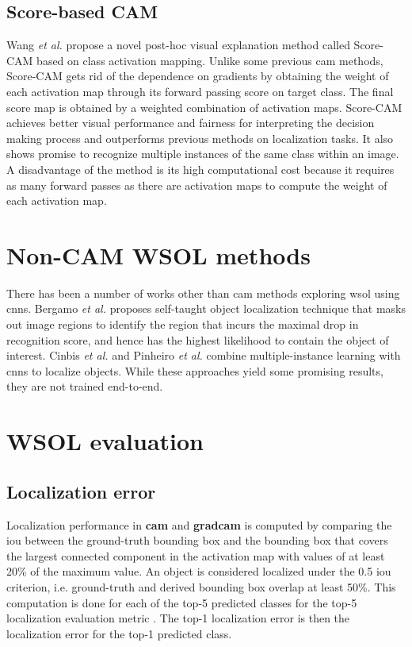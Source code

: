 \subsection{Score-based CAM}
Wang \textit{et al.} \cite{wang2020score} propose a novel post-hoc visual explanation method called Score-CAM based on class activation mapping. Unlike some previous \acrshort{cam} methods, Score-CAM gets rid of the dependence on gradients by obtaining the weight of each activation map through its forward passing score on target class. The final score map is obtained by a weighted combination of activation maps. Score-CAM achieves better visual performance and fairness for interpreting the decision making process and outperforms previous methods on localization tasks. It also shows promise to recognize multiple instances of the same class within an image. A disadvantage of the method is its high computational cost because it requires as many forward passes as there are activation maps to compute the weight of each activation map.

\section{Non-CAM WSOL methods}
There has been a number of works other than \acrshort{cam} methods exploring \acrfull{wsol} using \acrshort{cnn}s. Bergamo \textit{et al.} \cite{bazzani2016self} proposes self-taught object localization technique that masks out image regions to identify the region that incurs the maximal drop in recognition score, and hence has the highest likelihood to contain the object of interest. Cinbis \textit{et al.} \cite{cinbis2016weakly} and Pinheiro \textit{et al.} \cite{pinheiro2015image} combine multiple-instance learning with \acrshort{cnn}s to localize objects. While these approaches yield some promising results, they are not trained end-to-end.

\section{WSOL evaluation}
\subsection{Localization error}
Localization performance in \textbf{\acrshort{cam}} \cite{zhou2016cvpr} and \textbf{\acrshort{gradcam}} \cite{selvaraju2017grad} is computed by comparing the \acrfull{iou} between the ground-truth bounding box and the bounding box that covers the largest connected component in the activation map with values of at least 20\% of the maximum value. An object is considered localized under the 0.5 \acrshort{iou} criterion, i.e. ground-truth and derived bounding box overlap at least 50\%. This computation is done for each of the top-5 predicted classes for the top-5 localization evaluation metric \cite{russakovsky2015imagenet}. The top-1 localization error is then the localization error for the top-1 predicted class.

